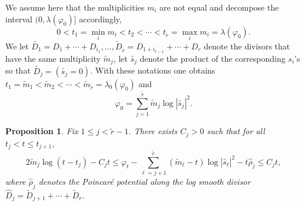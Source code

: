\documentclass[10pt,a4paper]{amsart}
\numberwithin{equation}{section}
\newtheorem{prop}[theorem]{Proposition}
\newcommand{\f}{\varphi}
\newcommand \la {\lambda}
\begin{document}
We assume here that the multiplicities $m_i$ are not equal and decompose 
the interval $(0,\la(\f_0)]$ accordingly,
$$
0<t_1=\min_i m_i <t_2 < \cdots <t_{\tilde{r}}=\max_i m_i=\la(\f_0).
$$
We let
$\tilde{D_1}=D_1 + \cdots + D_{i_1}, \ldots, \tilde{D}_{\tilde{r}}=D_{1+i_{{r}-1}} + \cdots + D_{r}$
denote the divisors that have the same multiplicity $\tilde{m}_j$,
let $\tilde{s_j}$ denote the product of the corresponding $s_i$'s so that
$\tilde{D_j}=(\tilde{s_j}=0)$.
With these notations one obtains
$t_1=\tilde{m}_1< \tilde{m}_2 < \cdots <\tilde{m}_{\tilde r}=\la_0(\f_0)$ and
$$
\f_0=\sum_{j=1}^{\tilde{r}} \tilde{m}_j \log |\tilde{s_j}|^2.
$$

\begin{prop} \label{prop:0uniform2}
Fix $1 \leq j < {\tilde r}-1$.
There exists $C_j>0$ such that for all $t_j <t \leq t_{j+1}$,
$$
2 \tilde{m}_j \log (t-t_j) -C_j t \leq 
\f_t -\sum_{\ell=j+1}^{\tilde{r}} (\tilde{m}_{\ell}-t) \log |\tilde{s_\ell}|^2 -t \hat{\rho}_j 
\leq C_j t,
$$
where $\hat{\rho}_j$ denotes the Poincaré potential along the log smooth divisor 
$\hat{D}_j=\tilde{D}_{j+1} + \cdots + \tilde{D}_r$.

\end{prop}
\end{document}
